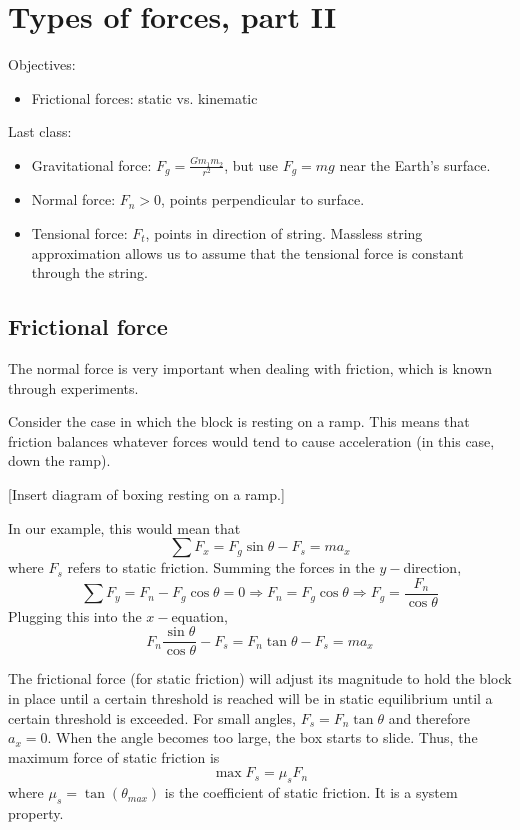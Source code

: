 \section{Types of forces, part II}
Objectives:
\begin{itemize}
\item Frictional forces: static vs. kinematic
\end{itemize}

Last class:
\begin{itemize}
\item Gravitational force: $F_g=\frac{Gm_1m_2}{r^2}$, but use $F_g=mg$ near the Earth's surface.
\item Normal force: $F_n>0$, points perpendicular to surface.
\item Tensional force: $F_t$, points in direction of string. Massless string approximation allows us to assume that the tensional force is constant through the string.
\end{itemize}

\subsection{Frictional force}
The normal force is very important when dealing with friction, which is known through experiments.

Consider the case in which the block is resting on a ramp. This means that friction balances whatever forces would tend to cause acceleration (in this case, down the ramp). 

[Insert diagram of boxing resting on a ramp.]
\vspace{5cm}

In our example, this would mean that
$$\sum F_x=F_g\sin\theta-F_s=ma_x$$
where $F_s$ refers to static friction. Summing the forces in the $y-$direction,
$$\sum F_y=F_n-F_g\cos\theta=0\Rightarrow F_n=F_g\cos\theta \Rightarrow F_g=\frac{F_n}{\cos\theta}$$
Plugging this into the $x-$equation,
$$F_n\frac{\sin\theta}{\cos\theta}-F_s=F_n\tan\theta-F_s=ma_x$$

The frictional force (for static friction) will adjust its magnitude to hold the block in place until a certain threshold is reached will be in static equilibrium until a certain threshold is exceeded. For small angles, $F_s=F_n\tan\theta$ and therefore $a_x=0$. When the angle becomes too large, the box starts to slide. Thus, the maximum force of static friction is
$$\boxed{\max F_s=\mu_s F_n}$$
where $\mu_s=\tan\left(\theta_{max}\right)$ is the coefficient of static friction. It is a system property.

